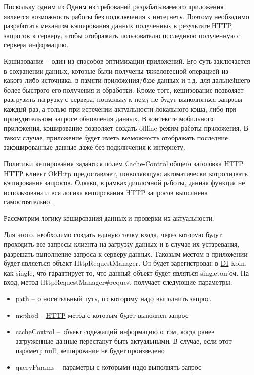 Поскольку одним из Одним из требований разрабатываемого приложения является возможность работы без подключения к интернету. 
Поэтому необходимо разработать механизм кэширования данных полученных в результате \hyperlink{gloss:http}{HTTP} запросов к серверу, 
чтобы  отображать пользователю последнюю полученную с сервера информацию.

Кэширование – один из способов оптимизации приложений.
Его суть заключается в сохранении данных, которые были получены тяжеловесной операцией из какого-либо источника, в памяти приложения/базе данных и т.д. для дальнейшего более быстрого его получения и обработки.
Кроме того, кеширование позволяет разгрузить нагрузку с сервера, поскольку к нему не будут выполняться запросы каждый раз, а только при истечении актуальности локального кэша, либо при принудительном запросе обновления данных.
В контексте мобильного приложения, кэширование позволяет создать offline режим работы приложения.
В таком случае, приложение будет иметь возможность отображать последние закэшированные данные даже без подключения к интернету.

Политики кеширования задаются полем Cache-Control общего заголовка \hyperlink{gloss:http}{HTTP}. \hyperlink{gloss:http}{HTTP} клиент OkHttp предоставляет, позволяющую автоматически котролирвать кэширование запросов.
Однако, в рамках дипломной работы, данная функция не  использована и вся логика кеширования \hyperlink{gloss:http}{HTTP} запросов выполнена самостоятельно.

Рассмотрим логику кеширования данных и проверки их актуальности.

Для этого, необходимо создать единую точку входа, через которую будут проходить все запросы клиента на загрузку данных и в случае их устаревания, разрешать выполнение запроса к серверу данных.
Таковым местом в приложении будет являеться объект HttpRequestManager.
Он будет зарегистрован в \hyperlink{gloss:di}{DI} Koin, как single, что гарантирует то, что данный объект будет являться singleton'ом.
На вход, метод HttpRequestManager\#request получает следующие параметры:
\begin{itemize}
    \item path – относительный путь, по которому надо выполнить запрос.
    \item method – \hyperlink{gloss:http}{HTTP} метод с которым будет выполнен запрос
    \item cacheControl – объект содежащий информацию о том, когда ранее загруженные данные перестанут быть актуальными.
    В случае, если этот параметр null, кеширование не будет произведено
    \item queryParams – параметры с которыми надо выполнять запрос
\end{itemize}

